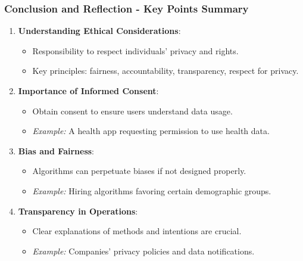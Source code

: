 \documentclass{beamer}
\begin{document}
\begin{frame}[fragile]
    \frametitle{Conclusion and Reflection - Key Points Summary}
    \begin{enumerate}
        \item \textbf{Understanding Ethical Considerations}:
        \begin{itemize}
            \item Responsibility to respect individuals' privacy and rights.
            \item Key principles: fairness, accountability, transparency, respect for privacy.
        \end{itemize}
        
        \item \textbf{Importance of Informed Consent}:
        \begin{itemize}
            \item Obtain consent to ensure users understand data usage.
            \item \textit{Example:} A health app requesting permission to use health data.
        \end{itemize}
        
        \item \textbf{Bias and Fairness}:
        \begin{itemize}
            \item Algorithms can perpetuate biases if not designed properly.
            \item \textit{Example:} Hiring algorithms favoring certain demographic groups.
        \end{itemize}
        
        \item \textbf{Transparency in Operations}:
        \begin{itemize}
            \item Clear explanations of methods and intentions are crucial.
            \item \textit{Example:} Companies’ privacy policies and data notifications.
        \end{itemize}
    \end{enumerate}
\end{frame}
\end{document}

